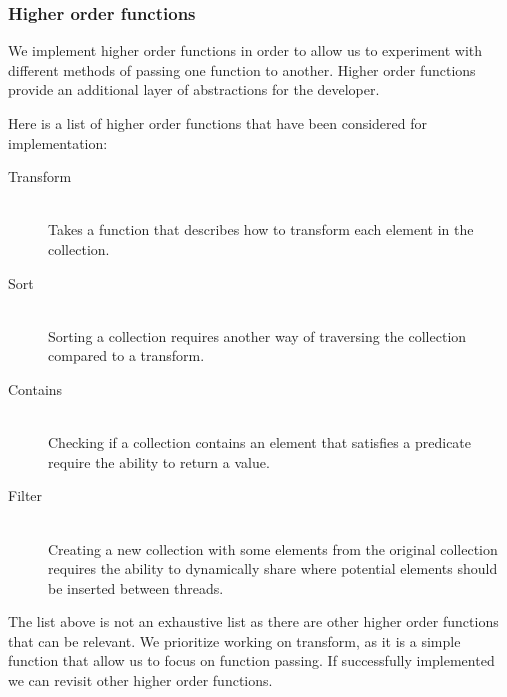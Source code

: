 \subsubsection{Higher order functions}
We implement higher order functions in order to allow us to experiment with different methods of passing one function to another. Higher order functions provide an additional layer of abstractions for the developer.


Here is a list of higher order functions that have been considered for implementation:
\begin{description}
\item[Transform]\hfill\\
Takes a function that describes how to transform each element in the collection.
\item[Sort] \hfill \\ 
Sorting a collection requires another way of traversing the collection compared to a transform.
\item[Contains] \hfill \\ 
Checking if a collection contains an element that satisfies a predicate require the ability to return a value.
\item[Filter] \hfill \\ 
Creating a new collection with some elements from the original collection requires the ability to dynamically share where potential elements should be inserted between threads.
\end{description}

The list above is not an exhaustive list as there are other higher order functions that can be relevant. We prioritize working on transform, as it is a simple function that allow us to focus on function passing. If successfully implemented we can revisit other higher order functions.